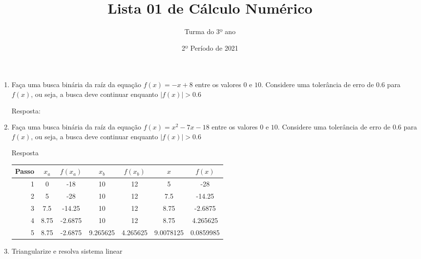 \documentclass[12pt]{article}
\title{Lista 01 de Cálculo Numérico}
\date{2º Período de 2021}
\author{Turma do 3º ano}
\begin{document}
\maketitle


\vspace{3em}

\begin{enumerate}


\item Faça uma busca binária da raíz da equação $f(x) = -x + 8$ entre os valores $0$ e $10$. 
Considere uma tolerância de erro de $0.6$ para $f(x)$, ou seja, a busca deve continuar enquanto $|f(x)|>0.6$

Resposta:


\item Faça uma busca binária da raíz da equação $f(x) = x^2 - 7x - 18$ entre os valores $0$ e $10$. 
Considere uma tolerância de erro de $0.6$ para $f(x)$, ou seja, a busca deve continuar enquanto $|f(x)|>0.6$

Resposta

\begin{tabular}{ |r|c|c|c|c|c|c| } 
 \hline
 Passo & $x_a$   & $f(x_a)$  & $x_b$      & $f(x_b)$  & $x$       & $f(x)$      \\ \hline
 1     &   0     &   -18     &   10       & 12        & 5         & -28         \\ \hline
 2     &   5     &   -28     &   10       & 12        & 7.5       & -14.25      \\ \hline
 3     &   7.5   &   -14.25  &   10       & 12        & 8.75      & -2.6875     \\ \hline
 4     &   8.75  &   -2.6875 &   10       & 12        & 8.75      &  4.265625   \\ \hline
 5     &   8.75  &   -2.6875 &   9.265625 &  4.265625 & 9.0078125 &  0.0859985  \\ \hline
\end{tabular}

\break


\item Triangularize e resolva sistema linear


\end{enumerate}
\end{document}

